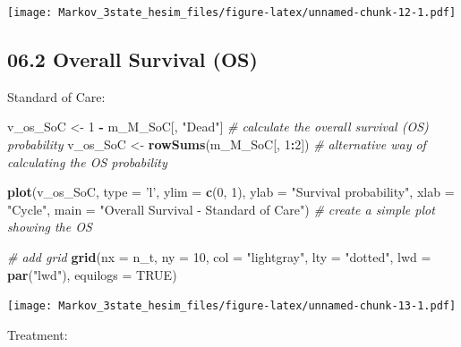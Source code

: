\documentclass[
]{article}
\newenvironment{Shaded}{\begin{snugshade}}{\end{snugshade}}
\newcommand{\CommentTok}[1]{\textcolor[rgb]{0.56,0.35,0.01}{\textit{#1}}}
\newcommand{\DataTypeTok}[1]{\textcolor[rgb]{0.13,0.29,0.53}{#1}}
\newcommand{\DecValTok}[1]{\textcolor[rgb]{0.00,0.00,0.81}{#1}}
\newcommand{\KeywordTok}[1]{\textcolor[rgb]{0.13,0.29,0.53}{\textbf{#1}}}
\newcommand{\NormalTok}[1]{#1}
\newcommand{\OperatorTok}[1]{\textcolor[rgb]{0.81,0.36,0.00}{\textbf{#1}}}
\newcommand{\OtherTok}[1]{\textcolor[rgb]{0.56,0.35,0.01}{#1}}
\newcommand{\StringTok}[1]{\textcolor[rgb]{0.31,0.60,0.02}{#1}}
\begin{document}
\texttt{[image: Markov\_3state\_hesim\_files/figure-latex/unnamed-chunk-12-1.pdf]}

\hypertarget{overall-survival-os}{%
\subsection{06.2 Overall Survival (OS)}\label{overall-survival-os}}

Standard of Care:

\begin{Shaded}
\begin{Highlighting}[]
\NormalTok{v_os_SoC <-}\StringTok{ }\DecValTok{1} \OperatorTok{-}\StringTok{ }\NormalTok{m_M_SoC[, }\StringTok{"Dead"}\NormalTok{]    }\CommentTok{# calculate the overall survival (OS) probability}
\NormalTok{v_os_SoC <-}\StringTok{ }\KeywordTok{rowSums}\NormalTok{(m_M_SoC[, }\DecValTok{1}\OperatorTok{:}\DecValTok{2}\NormalTok{])  }\CommentTok{# alternative way of calculating the OS probability   }

\KeywordTok{plot}\NormalTok{(v_os_SoC, }\DataTypeTok{type =} \StringTok{'l'}\NormalTok{, }
     \DataTypeTok{ylim =} \KeywordTok{c}\NormalTok{(}\DecValTok{0}\NormalTok{, }\DecValTok{1}\NormalTok{),}
     \DataTypeTok{ylab =} \StringTok{"Survival probability"}\NormalTok{,}
     \DataTypeTok{xlab =} \StringTok{"Cycle"}\NormalTok{,}
     \DataTypeTok{main =} \StringTok{"Overall Survival - Standard of Care"}\NormalTok{)  }\CommentTok{# create a simple plot showing the OS}

\CommentTok{# add grid }
\KeywordTok{grid}\NormalTok{(}\DataTypeTok{nx =}\NormalTok{ n_t, }\DataTypeTok{ny =} \DecValTok{10}\NormalTok{, }\DataTypeTok{col =} \StringTok{"lightgray"}\NormalTok{, }\DataTypeTok{lty =} \StringTok{"dotted"}\NormalTok{, }\DataTypeTok{lwd =} \KeywordTok{par}\NormalTok{(}\StringTok{"lwd"}\NormalTok{), }
     \DataTypeTok{equilogs =} \OtherTok{TRUE}\NormalTok{) }
\end{Highlighting}
\end{Shaded}

\texttt{[image: Markov\_3state\_hesim\_files/figure-latex/unnamed-chunk-13-1.pdf]}

Treatment:
\end{document}
